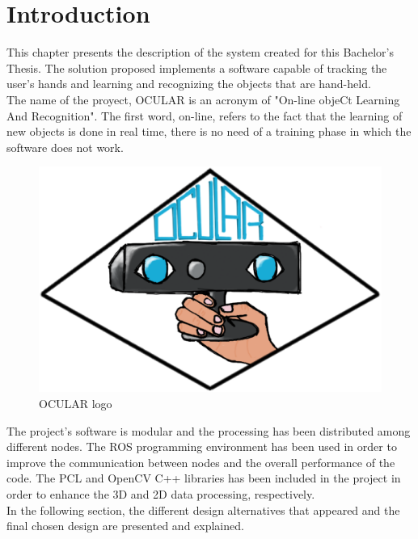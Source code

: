 \section{Introduction}

This chapter presents the description of the system created for this Bachelor's Thesis. The solution proposed implements a software capable of tracking the user's hands and learning and recognizing the objects that are hand-held. 
\\

The name of the proyect, OCULAR is an acronym of "On-line objeCt Learning And Recognition". The first word, on-line, refers to the fact that the learning of new objects is done in real time, there is no need of a training phase in which the software does not work. 
\\

\begin{figure}[h]
	\begin{center}
\includegraphics[scale=0.3]{img/ocular_logo.eps}
	\caption[OCULAR Logo]{OCULAR logo}
	\end{center}
\end{figure}

The project's software is modular and the processing has been distributed among different nodes. The ROS programming environment has been used in order to improve the communication between nodes and the overall performance of the code. The PCL and OpenCV C++ libraries has been included in the project in order to enhance the 3D and 2D data processing, respectively. 
\\
In the following section, the different design alternatives that appeared and the final chosen design are presented and explained.
